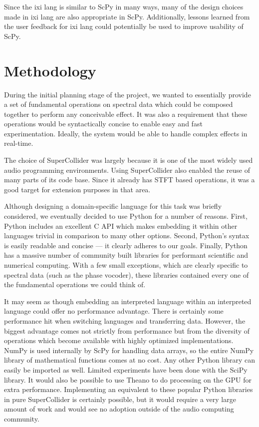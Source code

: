\documentclass{article}
\begin{document}
Since the ixi lang is similar to ScPy in many ways, many of the design choices made in ixi lang are
also appropriate in ScPy. Additionally, lessons learned from the user feedback for ixi lang could
potentially be used to improve usability of ScPy.

\section{Methodology}\label{sec:methodology}

During the initial planning stage of the project, we wanted to essentially provide a set of
fundamental operations on spectral data which could be composed together to perform any conceivable
effect. It was also a requirement that these operations would be syntactically concise to enable
easy and fast experimentation. Ideally, the system would be able to handle complex effects in
real-time.

The choice of SuperCollider was largely because it is one of the most widely used audio programming
environments. Using SuperCollider also enabled the reuse of many parts of its code base. Since it
already has STFT based operations, it was a good target for extension purposes in that area.

Although designing a domain-specific language for this task was briefly considered, we eventually
decided to use Python for a number of reasons. First, Python includes an excellent C API which
makes embedding it within other languages trivial in comparison to many other options. Second,
Python's syntax is easily readable and concise --- it clearly adheres to our goals. Finally, Python
has a massive number of community built libraries for performant scientific and numerical
computing. With a few small exceptions, which are clearly specific to spectral data (such as the
phase vocoder), these libraries contained every one of the fundamental operations we could think
of.

It may seem as though embedding an interpreted language within an interpreted language could offer
no performance advantage. There is certainly some performance hit when switching languages and
transferring data. However, the biggest advantage comes not strictly from performance but from the
diversity of operations which become available with highly optimized implementations. NumPy is used
internally by ScPy for handling data arrays, so the entire NumPy library of mathematical functions
comes at no cost. Any other Python library can easily be imported as well. Limited experiments
have been done with the SciPy library. It would also be possible to use Theano to do processing on
the GPU for extra performance. Implementing an equivalent to these popular Python libraries in pure
SuperCollider is certainly possible, but it would require a very large amount of work and would see
no adoption outside of the audio computing community.
\end{document}

